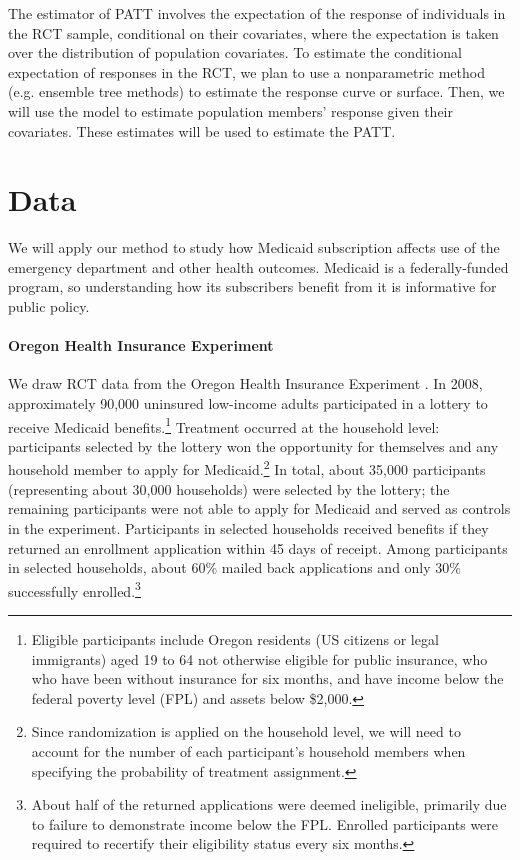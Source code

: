 \documentclass{article}
\begin{document}
The estimator of PATT involves the expectation of the response of individuals in the RCT sample, conditional on their covariates, where the expectation is taken over the distribution of population covariates.  To estimate the conditional expectation of responses in the RCT, we plan to use a nonparametric method (e.g. ensemble tree methods) to estimate the response curve or surface.  Then, we will use the model to estimate population members' response given their covariates.  These estimates will be used to estimate the PATT.

\section{Data}

We will apply our method to study how Medicaid subscription affects use of the emergency department and other health outcomes.  Medicaid is a federally-funded program, so understanding how its subscribers benefit from it is informative for public policy. \\

\paragraph{Oregon Health Insurance Experiment}

We draw RCT data from the Oregon Health Insurance Experiment \cite{finkelstein2012,Taubman}.  In 2008, approximately 90,000 uninsured low-income adults participated in a lottery to receive Medicaid benefits.\footnote{Eligible participants include Oregon residents (US citizens or legal immigrants) aged 19 to 64 not otherwise eligible for public insurance, who who have been without insurance for six months, and have income below the federal poverty level (FPL) and assets below \$2,000.} Treatment occurred at the household level: participants selected by the lottery won the opportunity for themselves and any household member to apply for Medicaid.\footnote{Since randomization is applied on the household level, we will need to account for the number of each participant's household members when specifying the probability of treatment assignment.} In total, about 35,000 participants (representing about 30,000 households) were selected by the lottery; the remaining participants were not able to apply for Medicaid and served as controls in the experiment.  Participants in selected households received benefits if they returned an enrollment application within 45 days of receipt. Among  participants in selected households, about 60\% mailed back applications and only 30\% successfully enrolled.\footnote{About half of the returned applications were deemed ineligible, primarily due to failure to demonstrate income below the FPL. Enrolled participants were required to recertify their eligibility status every six months.} \\
\end{document}
